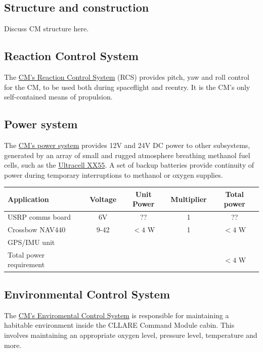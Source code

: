 \documentclass{report}
\begin{document}
\subsection{Structure and construction}

Discuss CM structure here.

\subsection{Reaction Control System}

The \href{http://cstart.org/wiki/CLLARE_CM_Reaction_Control_System}{CM's Reaction Control System} (RCS) provides pitch, yaw and roll control for the CM, to be used both during spaceflight and reentry. It is the CM's only self-contained means of propulsion.

\subsection{Power system}

The \href{http://cstart.org/wiki/CLLARE_CM_Power_System}{CM's power system} provides 12V and 24V DC power to other subsystems, generated by an array of small and rugged atmosphere breathing methanol fuel cells, such as the \href{http://www.ultracellpower.com/assets/XX55_Data_Sheet_01-27-2009.pdf}{Ultracell XX55}.  A set of backup batteries provide continuity of power during temporary interruptions to methanol or oxygen supplies.

\begin{tabular}{ | l | c | c | c | c | }
\hline
Application & Voltage & Unit Power & Multiplier & Total power \\
\hline
\hline
USRP comms board & 6V & ?? & 1 & ?? \\
\hline
Crossbow NAV440 & 9-42 & $<4$ W & 1 & $<4$ W \\
GPS/IMU unit & & & & \\
\hline
\hline
Total power requirement & & & & $<4$ W \\
\hline
\end{tabular}
\subsection{Environmental Control System}

The \href{http://cstart.org/wiki/CLLARE_Environmental_Control_System}{CM's Enviromental Control System} is responsible for maintaining a habitable environment inside the CLLARE Command Module cabin. This involves maintaining an appropriate oxygen level, pressure level, temperature and more.
\end{document}
